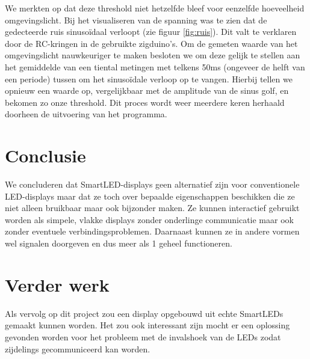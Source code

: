 \documentclass{article}
\begin{document}
We merkten op dat deze threshold niet hetzelfde bleef voor eenzelfde hoeveelheid omgevingslicht. Bij het visualiseren van de spanning was te zien dat de gedecteerde ruis sinusoïdaal verloopt (zie figuur \ref{fig:ruis}). Dit valt te verklaren door de RC-kringen in de gebruikte zigduino's. Om de gemeten waarde van het omgevingslicht nauwkeuriger te maken besloten we om deze gelijk te stellen aan het gemiddelde van een tiental metingen met telkens 50ms (ongeveer de helft van een periode) tussen om het sinusoïdale verloop op te vangen. Hierbij tellen we opnieuw een waarde op, vergelijkbaar met de amplitude van de sinus golf, en bekomen zo onze threshold. Dit proces wordt weer meerdere keren herhaald doorheen de uitvoering van het programma.


\section{Conclusie}
We concluderen dat SmartLED-displays geen alternatief zijn voor conventionele LED-displays maar dat ze toch over bepaalde eigenschappen beschikken die ze niet alleen bruikbaar maar ook bijzonder maken. Ze kunnen interactief gebruikt worden als simpele, vlakke displays zonder onderlinge communicatie maar ook zonder eventuele verbindingsproblemen. Daarnaast kunnen ze in andere vormen wel signalen doorgeven en dus meer als 1 geheel functioneren.


\section{Verder werk}
Als vervolg op dit project zou een display opgebouwd uit echte SmartLEDs gemaakt kunnen worden. Het zou ook interessant zijn mocht er een oplossing gevonden worden voor het probleem met de invalshoek van de LEDs zodat zijdelings gecommuniceerd kan worden.



\end{document}
